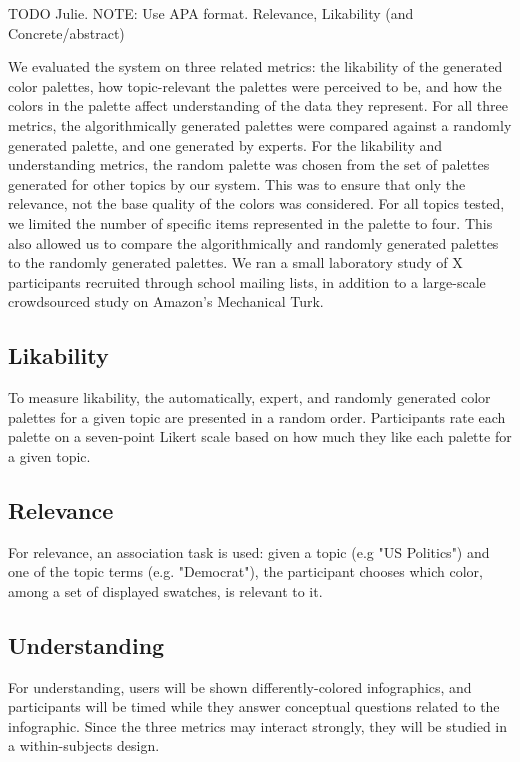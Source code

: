TODO Julie. NOTE: Use APA format.
Relevance, Likability (and Concrete/abstract)

We evaluated the system on three related metrics: the likability of the generated color palettes, how topic-relevant the palettes were perceived to be, and how the colors in the palette affect understanding of the data they represent. For all three metrics, the algorithmically generated palettes were compared against a randomly generated palette, and one generated by experts. For the likability and understanding metrics, the random palette was chosen from the set of palettes generated for other topics by our system. This was to ensure that only the relevance, not the base quality of the colors was considered. For all topics tested, we limited the number of specific items represented in the palette to four. This also allowed us to compare the algorithmically and randomly generated palettes to the randomly generated palettes. We ran a small laboratory study of X participants recruited through school mailing lists, in addition to a large-scale crowdsourced study on Amazon's Mechanical Turk. 

\subsection{Likability}
To measure likability, the automatically, expert, and randomly generated color palettes for a given topic are presented in a random order. Participants rate each palette on a seven-point Likert scale based on how much they like each palette for a given topic. 

\subsection{Relevance}
For relevance, an association task is used: given a topic (e.g "US Politics") and one of the topic terms (e.g. "Democrat"), the participant chooses which color, among a set of displayed swatches, is relevant to it.

\subsection{Understanding}
For understanding, users will be shown differently-colored infographics, and participants will be timed while they answer conceptual questions related to the infographic. Since the three metrics may interact strongly, they will be studied in a within-subjects design.